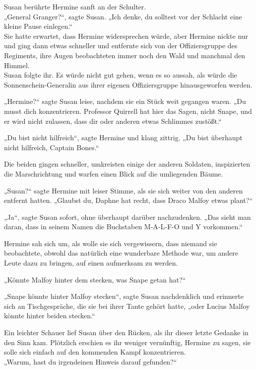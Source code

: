 {Susan berührte Hermine sanft an der Schulter.\\ „General Granger?“, sagte Susan. „Ich denke, du solltest vor der Schlacht eine kleine Pause einlegen.“\\ Sie hatte erwartet, dass Hermine widersprechen würde, aber Hermine nickte nur und ging dann etwas schneller und entfernte sich von der Offiziersgruppe des Regiments, ihre Augen beobachteten immer noch den Wald und manchmal den Himmel.\\ Susan folgte ihr. Es würde nicht gut gehen, wenn es so aussah, als würde die Sonnenschein-Generalin aus ihrer eigenen Offiziersgruppe hinausgeworfen werden.

„Hermine?“ sagte Susan leise, nachdem sie ein Stück weit gegangen waren. „Du musst dich konzentrieren. Professor Quirrell hat hier das Sagen, nicht Snape, und er wird nicht zulassen, dass dir oder anderen etwas Schlimmes zustößt.“

„Du bist nicht hilfreich“, sagte Hermine und klang zittrig. „Du bist überhaupt nicht hilfreich, Captain Bones.“

Die beiden gingen schneller, umkreisten einige der anderen Soldaten, inspizierten die Marschrichtung und warfen einen Blick auf die umliegenden Bäume.

„Susan?“ sagte Hermine mit leiser Stimme, als sie sich weiter von den anderen entfernt hatten. „Glaubst du, Daphne hat recht, dass Draco Malfoy etwas plant?“

„Ja“, sagte Susan sofort, ohne überhaupt darüber nachzudenken. „Das sieht man daran, dass in seinem Namen die Buchstaben M-A-L-F-O und Y vorkommen.“

Hermine sah sich um, als wolle sie sich vergewissern, dass niemand sie beobachtete, obwohl das natürlich eine wunderbare Methode war, um andere Leute dazu zu bringen, auf einen aufmerksam zu werden.

„Könnte Malfoy hinter dem stecken, was Snape getan hat?“

„Snape könnte hinter Malfoy stecken“, sagte Susan nachdenklich und erinnerte sich an Tischgespräche, die sie bei ihrer Tante gehört hatte, „oder Lucius Malfoy könnte hinter beiden stecken.“

Ein leichter Schauer lief Susan über den Rücken, als ihr dieser letzte Gedanke in den Sinn kam. Plötzlich erschien es ihr weniger vernünftig, Hermine zu sagen, sie solle sich einfach auf den kommenden Kampf konzentrieren.\\ „Warum, hast du irgendeinen Hinweis darauf gefunden?“

}
